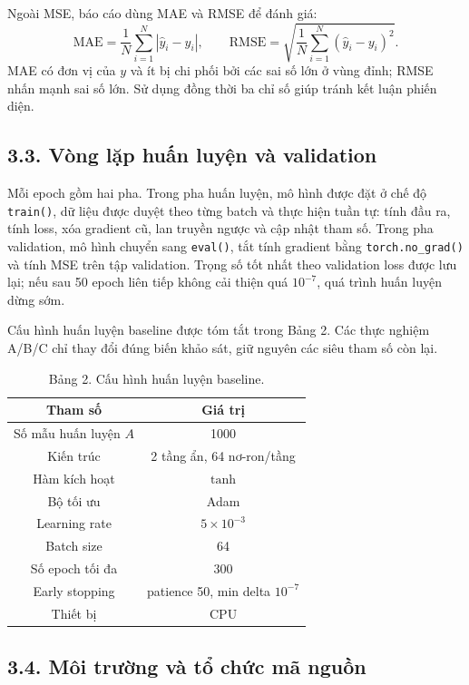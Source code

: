 \documentclass[12pt,a4paper]{article}
\begin{document}
Ngoài MSE, báo cáo dùng MAE và RMSE để đánh giá:
$$\mathrm{MAE} = \frac{1}{N}\sum_{i=1}^{N}\left|\hat{y}_i - y_i\right|, \qquad \mathrm{RMSE} = \sqrt{\frac{1}{N}\sum_{i=1}^{N}\left(\hat{y}_i - y_i\right)^2}.$$
MAE có đơn vị của $y$ và ít bị chi phối bởi các sai số lớn ở vùng đỉnh; RMSE nhấn mạnh sai số lớn. Sử dụng đồng thời ba chỉ số giúp tránh kết luận phiến diện.

\subsection{3.3. Vòng lặp huấn luyện và validation}

Mỗi epoch gồm hai pha. Trong pha huấn luyện, mô hình được đặt ở chế độ \texttt{train()}, dữ liệu được duyệt theo từng batch và thực hiện tuần tự: tính đầu ra, tính loss, xóa gradient cũ, lan truyền ngược và cập nhật tham số. Trong pha validation, mô hình chuyển sang \texttt{eval()}, tắt tính gradient bằng \texttt{torch.no_grad()} và tính MSE trên tập validation. Trọng số tốt nhất theo validation loss được lưu lại; nếu sau 50 epoch liên tiếp không cải thiện quá $10^{-7}$, quá trình huấn luyện dừng sớm.

Cấu hình huấn luyện baseline được tóm tắt trong Bảng 2. Các thực nghiệm A/B/C chỉ thay đổi đúng biến khảo sát, giữ nguyên các siêu tham số còn lại.

\begin{table}[h]
\centering
\caption{Bảng 2. Cấu hình huấn luyện baseline.}
\begin{tabular}{|c|c|}
\hline
Tham số & Giá trị \\
\hline
Số mẫu huấn luyện $A$ & 1000 \\
\hline
Kiến trúc & 2 tầng ẩn, 64 nơ-ron/tầng \\
\hline
Hàm kích hoạt & $\tanh$ \\
\hline
Bộ tối ưu & Adam \\
\hline
Learning rate & $5\times10^{-3}$ \\
\hline
Batch size & 64 \\
\hline
Số epoch tối đa & 300 \\
\hline
Early stopping & patience 50, min delta $10^{-7}$ \\
\hline
Thiết bị & CPU \\
\hline
\end{tabular}
\end{table}

\subsection{3.4. Môi trường và tổ chức mã nguồn}
\end{document}
